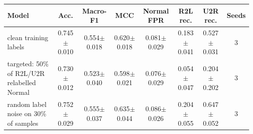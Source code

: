 \begin{tabular}{lccccccc}
\toprule
Model & Acc. & Macro-F1 & MCC & Normal FPR & R2L rec. & U2R rec. & Seeds \\
\midrule
clean training labels & 0.745$\pm$0.010 & 0.554$\pm$0.018 & 0.620$\pm$0.018 & 0.081$\pm$0.029 & 0.183$\pm$0.041 & 0.527$\pm$0.031 & 3 \\
targeted: 50\% of R2L/U2R relabelled Normal & 0.730$\pm$0.012 & 0.523$\pm$0.040 & 0.598$\pm$0.021 & 0.076$\pm$0.029 & 0.054$\pm$0.047 & 0.204$\pm$0.202 & 3 \\
random label noise on 30\% of samples & 0.752$\pm$0.029 & 0.555$\pm$0.037 & 0.635$\pm$0.044 & 0.086$\pm$0.026 & 0.204$\pm$0.055 & 0.647$\pm$0.052 & 3 \\
\bottomrule
\end{tabular}
